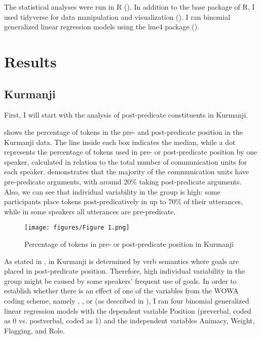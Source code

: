 \documentclass[output=paper,colorlinks,citecolor=brown]{langscibook}
\begin{document}
The statistical analyses were run in R (\citealt{R_core_team}). In addition to the base package of R, I used tidyverse for data manipulation and visualization (\citealt{wickham2019tidyverse}). I ran binomial generalized linear regression models using the lme4 package (\citealt{bates2015lme4}).

\section{Results}\label{Bilingual:ss:6}

\subsection{Kurmanji}\label{Bilingual:ss:6.1}

First, I will start with the analysis of post-predicate constituents in Kurmanji.

 shows the percentage of tokens in the pre- and post-predicate position in the Kurmanji data. The line inside each box indicates the median, while a dot represents the percentage of tokens used in pre- or post-predicate position by one speaker, calculated in relation to the total number of communication units for each speaker.  demonstrates that the majority of the communication units have pre-predicate arguments, with around 20\% taking post-predicate arguments. Also, we can see that individual variability in the group is high: some participants place tokens post-predicatively in up to 70\% of their utterances, while in some speakers all utterances are pre-predicate.

\begin{figure}
 \centering
 \texttt{[image: figures/Figure 1.png]}
 \caption{Percentage of tokens in pre- or post-predicate position in Kurmanji }
 \label{Bilingual:fig:1}
\end{figure}

As stated in ,  in Kurmanji is determined by verb semantics where goals are placed in post-predicate position. Therefore, high individual variability in the group might be caused by some speakers' frequent use of goals. In order to establish whether there is an effect of one of the variables from the WOWA coding scheme, namely , ,  or  (as described in ), I ran four binomial generalized linear regression models with the dependent variable Position (preverbal, coded as 0 vs. postverbal, coded as 1) and the independent variables Animacy, Weight, Flagging, and Role.
\end{document}
